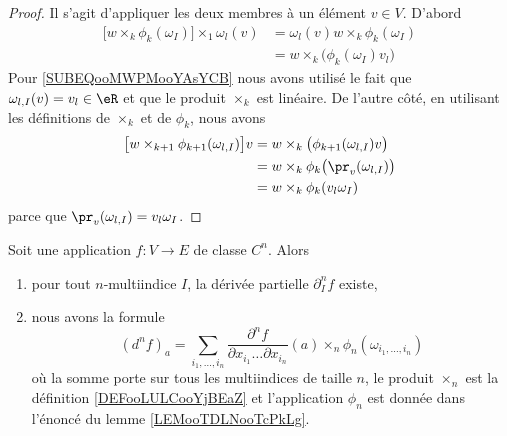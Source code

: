 \begin{proof}
	Il s'agit d'appliquer les deux membres à un élément \( v\in V\). D'abord
	\begin{subequations}
		\begin{align}
			\big[ w\times_k\phi_k(\omega_I) \big]\times_1\omega_l(v) & =\omega_l(v)w\times_k\phi_k(\omega_I)                                      \\
			                                                         & =w\times_k\big( \phi_k(\omega_I)v_l \big)      \label{SUBEQooMWPMooYAsYCB}
		\end{align}
	\end{subequations}
	Pour \eqref{SUBEQooMWPMooYAsYCB} nous avons utilisé le fait que \( \omega_{l,I}(v)=v_l\in\eR\) et que le produit \( \times_k\) est linéaire. De l'autre côté, en utilisant les définitions de \( \times_{k}\) et de \( \phi_k\), nous avons
	\begin{subequations}
		\begin{align}
			\big[ w\times_{k+1}\phi_{k+1}(\omega_{l,I}) \big]v & =w\times_k\big( \phi_{k+1}(\omega_{l,I})v \big) \\
			                                                   & =w\times_k\phi_k\big( \pr_v(\omega_{l,I}) \big) \\
			                                                   & =w\times_k\phi_k(v_l\omega_I)
		\end{align}
	\end{subequations}
	parce que \( \pr_v(\omega_{l,I})=v_l\omega_I\).
\end{proof}

\begin{proposition}      \label{PROPooVGRRooHSwcPl}
	Soit une application \( f\colon V\to E\) de classe \( C^n\). Alors
	\begin{enumerate}
		\item
		      pour tout \( n\)-multiindice \( I\), la dérivée partielle \( \partial^n_If\) existe,
		\item
		      nous avons la formule
		      \begin{equation}
			      (d^nf)_a=\sum_{i_1,\ldots, i_n}\frac{ \partial^nf }{ \partial x_{i_1}\ldots \partial x_{i_n} }(a)\times_n\phi_n(\omega_{i_1,\ldots, i_n})
		      \end{equation}
		      où la somme porte sur tous les multiindices de taille \( n\), le produit \( \times_n\) est la définition \ref{DEFooLULCooYjBEaZ} et l'application \( \phi_n\) est donnée dans l'énoncé du lemme \ref{LEMooTDLNooTcPkLg}.
	\end{enumerate}
\end{proposition}

